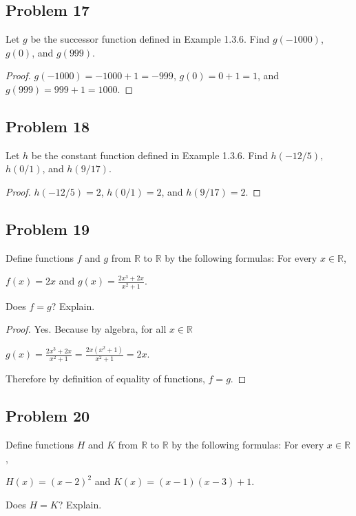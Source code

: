 \documentclass[14pt]{extarticle}
\newcommand{\dps}{\displaystyle}
\newcommand{\R}{\mathbb{R}}
\begin{document}
\subsection{Problem 17}
Let $g$ be the successor function defined in Example 1.3.6.
Find $g(-1000)$, $g(0)$, and $g(999)$.

\begin{proof}
$g(-1000) = -1000 + 1 = -999$, $g(0) = 0 + 1 = 1$, and $g(999) = 999 + 1 = 1000$.
\end{proof}

\subsection{Problem 18}
Let $h$ be the constant function defined in Example 1.3.6.
Find $h(-12/5),$ $h(0/1)$, and $h(9/17)$.

\begin{proof}
$h(-12/5) = 2$, $h(0/1) = 2$, and $h(9/17) = 2$.
\end{proof}

\subsection{Problem 19}
Define functions $f$ and $g$ from $\R$ to $\R$ by the following formulas:
For every $x \in \R$,

\begin{center}
$f(x) = 2x$ and $\dps g(x) = \frac{2x^3 + 2x}{x^2 + 1}$.
\end{center}

Does $f = g$? Explain.

\begin{proof}
Yes. Because by algebra, for all $x \in \R$

$\dps g(x) = \frac{2x^3 + 2x}{x^2 + 1} = \frac{2x(x^2 + 1)}{x^2 + 1} = 2x$.

Therefore by definition of equality of functions, $f = g$.
\end{proof}

\subsection{Problem 20}
Define functions $H$ and $K$ from $\R$ to $\R$ by the following formulas:
For every $x \in \R$,

\begin{center}
$H(x) = (x - 2)^2$ and $K(x) = (x - 1)(x - 3) + 1$.
\end{center}

Does $H = K$? Explain.
\end{document}
